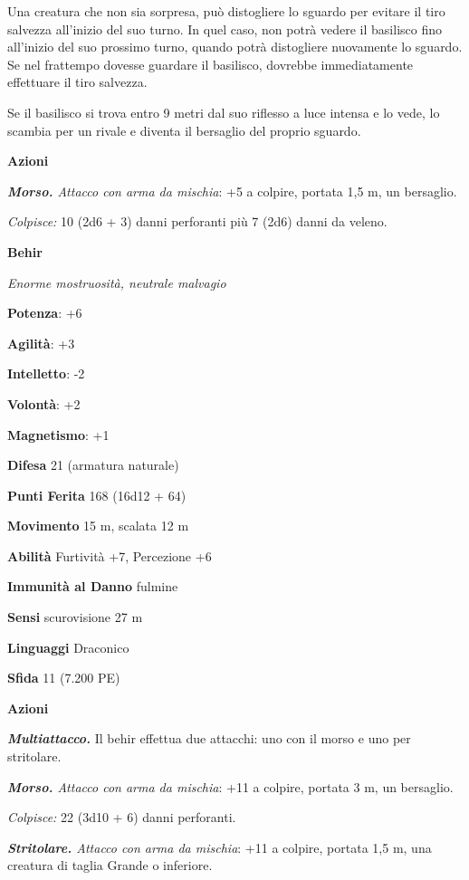 \begin{multicols}{2}
Una creatura che non sia sorpresa, può distogliere lo sguardo per
evitare il tiro salvezza all'inizio del suo turno. In quel caso, non
potrà vedere il basilisco fino all'inizio del suo prossimo turno, quando
potrà distogliere nuovamente lo sguardo. Se nel frattempo dovesse
guardare il basilisco, dovrebbe immediatamente effettuare il tiro
salvezza.

Se il basilisco si trova entro 9 metri dal suo riflesso a luce intensa e
lo vede, lo scambia per un rivale e diventa il bersaglio del proprio
sguardo.

\textbf{Azioni}

\emph{\textbf{Morso.} Attacco con arma da mischia}: +5 a colpire,
portata 1,5 m, un bersaglio.

\emph{Colpisce:} 10 (2d6 + 3) danni perforanti più 7 (2d6) danni da
veleno.




\textbf{Behir}

\emph{Enorme mostruosità, neutrale malvagio}

\textbf{Potenza}: +6

\textbf{Agilità}: +3

\textbf{Intelletto}: -2

\textbf{Volontà}: +2

\textbf{Magnetismo}: +1

\textbf{Difesa} 21 (armatura naturale)

\textbf{Punti Ferita} 168 (16d12 + 64)

\textbf{Movimento} 15 m, scalata 12 m

\textbf{Abilità} Furtività +7, Percezione +6

\textbf{Immunità al Danno} fulmine

\textbf{Sensi} scurovisione 27 m

\textbf{Linguaggi} Draconico

\textbf{Sfida} 11 (7.200 PE)

\textbf{Azioni}

\emph{\textbf{Multiattacco.}} Il behir effettua due attacchi: uno con il
morso e uno per stritolare.

\emph{\textbf{Morso.} Attacco con arma da mischia}: +11 a colpire,
portata 3 m, un bersaglio.

\emph{Colpisce:} 22 (3d10 + 6) danni perforanti.

\emph{\textbf{Stritolare.} Attacco con arma da mischia}: +11 a colpire,
portata 1,5 m, una creatura di taglia Grande o inferiore.


\end{multicols}

